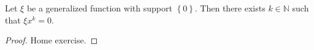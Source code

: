 \documentclass[12pt, draft,reqno,a4paper, twoside]{amsproc}
\newcommand{\supp}{\mathrm{Supp}}
\newcommand{\dbN}{\mathbb N}
\newcommand{\dbR}{\mathbb R}
\newcommand{\gen}[1]{\langle{#1}\rangle}
\newcommand{\set}[1]{\left\{{#1}\right\}}
\newcommand{\norm}[1]{\left\|#1\right\|}
\newcommand{\abs}[1]{\left|#1\right|}
\begin{document}
\begin{lem}Let $\xi$ be a generalized function with support $\set{0}$. Then there exists $k\in\dbN$ such that $\xi x^k=0$. 
 \end{lem}
\begin{proof}	
	Home exercise.
\end{proof}
%
%
\end{document}
